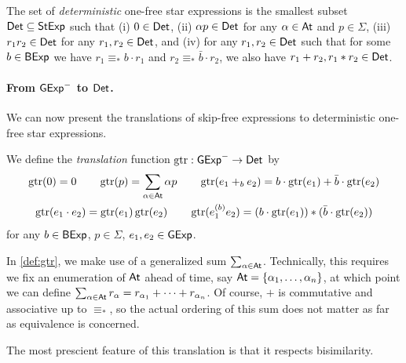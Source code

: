\documentclass[orivec,envcountsect,envcountsame]{llncs}
\begin{document}

\begin{definition}\label{def:deterministic sexp}
    The set of \emph{deterministic} one-free star expressions is the smallest subset \(\mathsf{Det}\subseteq \mathsf{StExp}\) such that (i) \(0 \in \mathsf{Det}\), (ii) \(\alpha p \in \mathsf{Det}\) for any \(\alpha \in \mathsf{At}\) and \(p \in \Sigma\), (iii) \(r_1r_2 \in \mathsf{Det}\) for any \(r_1,r_2 \in \mathsf{Det}\), and (iv) for any \(r_1, r_2 \in \mathsf{Det}\) such that for some $b \in \mathsf{BExp}$ we have \(r_1 \equiv_* b\cdot r_1\) and \(r_2 \equiv_* \bar b \cdot r_2\), we also have \(r_1 + r_2, r_1 *r_2 \in \mathsf{Det}\).
\end{definition}


\paragraph*{\bf From \(\mathsf{GExp}^-\) to $\mathsf{Det}$.} We can now present the translations of skip-free expressions to deterministic one-free star expressions.
\begin{definition}\label{def:gtr}
    We define the \emph{translation} function \(\operatorname{gtr} : \mathsf{GExp}^- \to \mathsf{Det}\) by
    \begin{gather*}
        \operatorname{gtr}(0) = 0
        \qquad
        \operatorname{gtr}(p) = \sum_{\alpha \in \mathsf{At}} \alpha p
        \qquad
        \operatorname{gtr}(e_1 +_b e_2) = b\cdot \operatorname{gtr}(e_1) + \bar b\cdot \operatorname{gtr}(e_2)
        \\
        \operatorname{gtr}(e_1\cdot e_2) = \operatorname{gtr}(e_1)\operatorname{gtr}(e_2)
        \qquad
        \operatorname{gtr}(e_1^{(b)}e_2) = (b \cdot \operatorname{gtr}(e_1))*(\bar b \cdot \operatorname{gtr}(e_2))
    \end{gather*}
    for any \(b \in \mathsf{BExp}\), \(p \in \Sigma\), \(e_1,e_2 \in \mathsf{GExp}\).
\end{definition}
\begin{remark}
    In \cref{def:gtr}, we make use of a generalized sum \(\sum_{\alpha \in \mathsf{At}}\).
    Technically, this requires we fix an enumeration of \(\mathsf{At}\) ahead of time, say \(\mathsf{At} = \{\alpha_1, \dots, \alpha_{n}\}\), at which point we can define \(\sum_{\alpha \in \mathsf{At}} r_\alpha = r_{\alpha_1} + \cdots + r_{\alpha_n}\).
    Of course, $+$ is commutative and associative up to $\equiv_*$, so the actual ordering of this sum does not matter as far as equivalence is concerned.
\end{remark}

The most prescient feature of this translation is that it respects bisimilarity.
\end{document}
